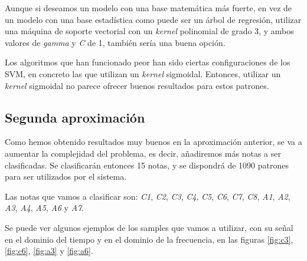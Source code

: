 \documentclass[12pt]{article}
\begin{document}
\bigskip
Aunque si deseamos un modelo con una base matemática más fuerte, en vez de un modelo con una base estadística como puede ser un árbol de regresión,
utilizar una máquina de soporte vectorial con un \textit{kernel} polinomial de grado 3, y ambos valores de \textit{gamma} y \textit{C} de 1, también sería una buena opción. 

Los algoritmos que han funcionado peor han sido ciertas configuraciones de los SVM, en concreto las que utilizan un \textit{kernel} sigmoidal.
Entonces, utilizar un \textit{kernel} sigmoidal no parece ofrecer buenos resultados para estos patrones.

\newpage
\subsection{Segunda aproximación}
\label{Segunda aproximación}
Como hemos obtenido resultados muy buenos en la aproximación anterior, se va a aumentar la complejidad del problema,
es decir, añadiremos más notas a ser clasificadas. Se clasificarán entonces 15 notas, y se dispondrá de 
1090 patrones para ser utilizados por el sistema.

Las notas que vamos a clasificar son: \textit{C1}, \textit{C2}, \textit{C3}, \textit{C4}, \textit{C5}, \textit{C6}, \textit{C7}, \textit{C8}, \textit{A1}, \textit{A2}, \textit{A3}, \textit{A4}, \textit{A5}, \textit{A6} y \textit{A7}.

\bigskip
Se puede ver algunos ejemplos de los samples que vamos a utilizar, con su señal en el dominio del tiempo y en el
dominio de la frecuencia, en las figuras \ref{fig:c3}, \ref{fig:c6}, \ref{fig:a3} y \ref{fig:a6}.
\end{document}
